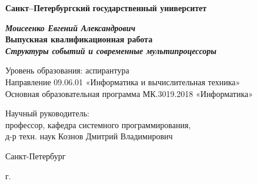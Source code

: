 
\begin{titlepage}
\begin{center}

\textbf{Санкт--Петербургский}
\textbf{государственный университет}

\vspace{35mm}

\textbf{\textit{\large Моисеенко Евгений Александрович}} \\[8mm]
\textbf{\large Выпускная квалификационная работа}\\[3mm]
\textbf{\textit{\large Структуры событий и современные мультипроцессоры}}

\vspace{20mm}
Уровень образования: аспирантура\\
Направление 09.06.01 «Информатика и вычислительная техника»\\
Основная образовательная программа МК.3019.2018 «Информатика»\\


\begin{flushright}
\begin{minipage}[t]{0.7\textwidth}
{Научный руководитель:} \\
профессор, кафедра системного программирования, \\ д-р техн. наук Кознов Дмитрий Владимирович

\vspace{10mm}


\end{minipage}
\end{flushright}

\vfill 

{Санкт-Петербург}
\par{\the\year{} г.}
\end{center}
\end{titlepage}
\restoregeometry
\addtocounter{page}{1}

